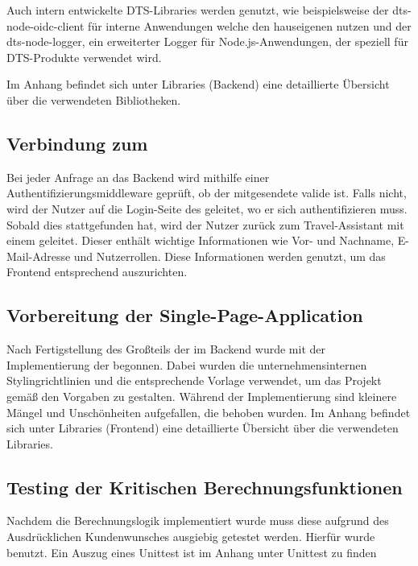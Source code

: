 Auch intern entwickelte DTS-Libraries werden genutzt, wie beispielsweise der dts-node-oidc-client für interne Anwendungen welche den hauseigenen  nutzen und der dts-node-logger, ein erweiterter Logger für Node.js-Anwendungen, der speziell für DTS-Produkte verwendet wird.

Im Anhang befindet sich unter Libraries (Backend) eine detaillierte Übersicht über die verwendeten Bibliotheken. \todo

\subsection{Verbindung zum }

Bei jeder Anfrage an das Backend wird mithilfe einer Authentifizierungsmiddleware geprüft, ob der mitgesendete  valide ist. Falls nicht, wird der Nutzer auf die Login-Seite des  geleitet, wo er sich authentifizieren muss. Sobald dies stattgefunden hat, wird der Nutzer zurück zum Travel-Assistant mit einem  geleitet. Dieser  enthält wichtige Informationen wie Vor- und Nachname, E-Mail-Adresse und Nutzerrollen. Diese Informationen werden genutzt, um das Frontend entsprechend auszurichten.

\subsection{Vorbereitung der Single-Page-Application}

Nach Fertigstellung des Großteils der  im Backend wurde mit der Implementierung der  begonnen. Dabei wurden die unternehmensinternen Stylingrichtlinien und die entsprechende Vorlage verwendet, um das Projekt gemäß den Vorgaben zu gestalten. Während der Implementierung sind kleinere Mängel und Unschönheiten aufgefallen, die behoben wurden. Im Anhang befindet sich unter Libraries (Frontend) eine detaillierte Übersicht über die verwendeten Libraries.

\subsection{Testing der Kritischen Berechnungsfunktionen}

Nachdem die Berechnungslogik implementiert wurde muss diese aufgrund des Ausdrücklichen Kundenwunsches ausgiebig getestet werden. Hierfür wurde  benutzt. Ein Auszug eines Unittest ist im Anhang unter Unittest zu finden\todo